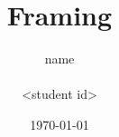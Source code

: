 \documentclass[11pt,a4paper,UKenglish]{memoir}
\title{Framing}
\author{name\\
        \\
        <student id>
}
\date{\today}
\begin{document}
\frontmatter %


\tableofcontents
\listoffigures
\listoftables

\mainmatter %








\appendix %
\renewcommand{\appendixtocname}{Appendix} %
\addappheadtotoc %

\backmatter %
\end{document}
